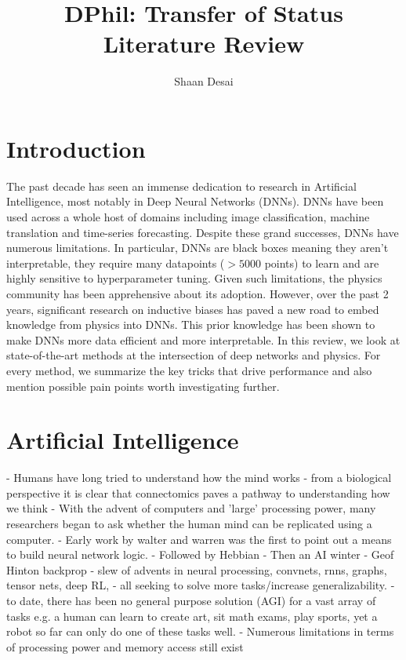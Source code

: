\documentclass{article}
\title{DPhil: Transfer of Status Literature Review}
\author{Shaan Desai }
\begin{document}
\maketitle


\tableofcontents
\section{Introduction}

The past decade has seen an immense dedication to research in Artificial Intelligence, most notably in Deep Neural Networks (DNNs). DNNs have been used across a whole host of domains including image classification, machine translation and time-series forecasting. Despite these grand successes, DNNs have numerous limitations. In particular, DNNs are black boxes meaning they aren't interpretable, they require many datapoints ($>5000$ points) to learn and are highly sensitive to hyperparameter tuning. Given such limitations, the physics community has been apprehensive about its adoption. However, over the past 2 years, significant research on inductive biases has paved a new road to embed knowledge from physics into DNNs. This prior knowledge has been shown to make DNNs more data efficient and more interpretable. In this review, we look at state-of-the-art methods at the intersection of deep networks and physics. For every method, we summarize the key tricks that drive performance and also mention possible pain points worth investigating further.


\section{Artificial Intelligence}

- Humans have long tried to understand how the mind works
- from a biological perspective it is clear that connectomics paves a pathway to understanding how we think
- With the advent of computers and 'large' processing power, many researchers began to ask whether the human mind can be replicated using a computer.
- Early work by walter and warren was the first to point out a means to build neural network logic.
- Followed by Hebbian
- Then an AI winter
- Geof Hinton backprop
- slew of advents in neural processing, convnets, rnns, graphs, tensor nets, deep RL, 
- all seeking to solve more tasks/increase generalizability.
- to date, there has been no general purpose solution (AGI) for a vast array of tasks e.g. a human can learn to create art, sit math exams, play sports, yet a robot so far can only do one of these tasks well.
- Numerous limitations in terms of processing power and memory access still exist
\end{document}

